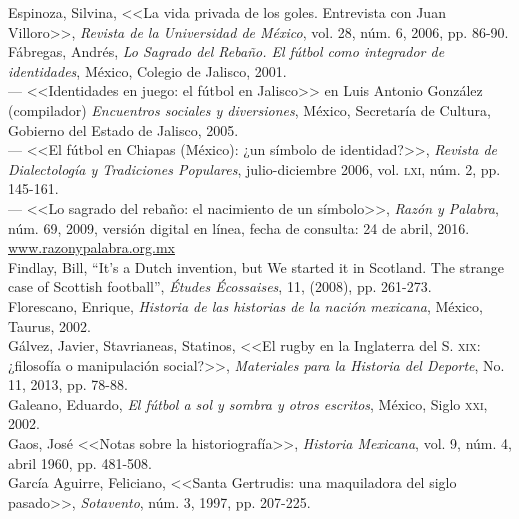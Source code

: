\documentclass[11pt,a5paper,twoside]{book} %
\begin{document}
\begin{hangparas}{1cm}{1}
\noindent Espinoza, Silvina, <<La vida privada de los goles. Entrevista con Juan Villoro>>, \emph{Revista de la Universidad de México}, vol. 28, núm. 6, 2006, pp. 86-90. \\

\noindent Fábregas, Andrés, \emph{Lo Sagrado del Rebaño. El fútbol como integrador de identidades}, México, Colegio de Jalisco, 2001. \\

\noindent --- <<Identidades en juego: el fútbol en Jalisco>> en Luis Antonio González (compilador) \emph{Encuentros sociales y diversiones}, México, Secretaría de Cultura, Gobierno del Estado de Jalisco, 2005. \\

\noindent --- <<El fútbol en Chiapas (México): ¿un símbolo de identidad?>>, \emph{Revista de Dialectología y Tradiciones Populares}, julio-di\-ciembre 2006, vol. \textsc{lxi}, núm. 2, pp. 145-161. \\

\noindent --- <<Lo sagrado del rebaño: el nacimiento de un símbolo>>, \emph{Razón y Palabra}, núm. 69, 2009, versión digital en línea, fecha de consulta: 24 de abril, 2016. \url{www.razonypalabra.org.mx} \\

\noindent Findlay, Bill, “It’s a Dutch invention, but We started it in Scotland. The strange case of
Scottish football”, \emph{Études Écossaises}, 11, (2008), pp. 261-273. \\

Florescano, Enrique, \emph{Historia de las historias de la nación mexicana}, México, Taurus, 2002. \\

Gálvez, Javier, Stavrianeas, Statinos, <<El rugby en la Inglaterra del S. \textsc{xix}: ¿filosofía o
manipulación social?>>, \emph{Materiales para la Historia del Deporte}, No. 11, 2013, pp. 78-88. \\

Galeano, Eduardo, \emph{El fútbol a sol y sombra y otros escritos}, México, Siglo \textsc{xxi}, 2002. \\

\noindent Gaos, José <<Notas sobre la historiografía>>, \emph{Historia Mexicana}, vol. 9, núm. 4, abril 1960, pp. 481-508. \\

\noindent García Aguirre, Feliciano, <<Santa Gertrudis: una maquiladora del siglo pasado>>, \emph{Sotavento}, núm. 3, 1997, pp. 207-225. \\


\end{hangparas}
\end{document}
